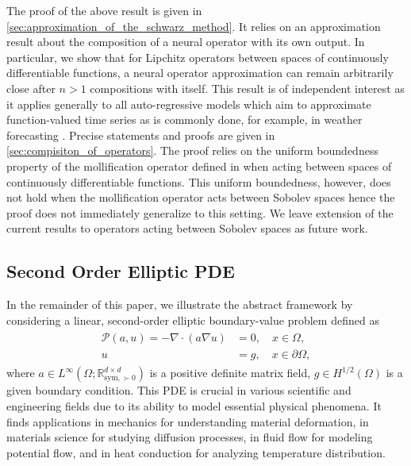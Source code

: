 \documentclass[preprint,11pt]{elsarticle}
\theoremstyle{plain}
\begin{document}
The proof of the above result is given in \ref{sec:approximation_of_the_schwarz_method}. It relies on an approximation result about the composition of a neural operator with its own output. In particular, we show that for Lipchitz operators between spaces of continuously differentiable functions, a neural operator approximation can remain arbitrarily close after $n > 1$ compositions with itself. This result is of independent interest as it applies generally to all auto-regressive models which aim to approximate function-valued time series as is commonly done, for example, in weather forecasting \cite{pathak2022fourcastnet, lam2023learning}. Precise statements and proofs are given in \ref{sec:compisiton_of_operators}. The proof relies on the uniform boundedness property of the mollification operator defined in \cite[Appendix A]{lanthaler2023nonlocality} when acting between spaces of continuously differentiable functions. This uniform boundedness, however, does not hold when the mollification operator acts between Sobolev spaces hence the proof does not immediately generalize to this setting. We leave extension of the current results to operators acting between Sobolev spaces as future work. 



\subsection{Second Order Elliptic PDE}
In the remainder of this paper, we illustrate the abstract framework by considering a linear, second-order elliptic boundary-value problem defined as
\begin{align}
\label{eq:second_order_elliptic_pde}
\begin{split}
    \mathcal{P}(a, u) = -\nabla \cdot (a \nabla u)  &= 0, \quad x \in \Omega, \\
    u &= g, \quad x \in \partial \Omega,
\end{split}
\end{align}
where \(a \in  L^{\infty} (\Omega; \mathbb{R}^{d \times d}_{\text{sym}, \succ 0})\) is a positive definite matrix field, $g \in H^{1/2}(\Omega)$ is a given boundary condition. This PDE is crucial in various scientific and engineering fields due to its ability to model essential physical phenomena. It finds applications in mechanics for understanding material deformation, in materials science for studying diffusion processes, in fluid flow for modeling potential flow, and in heat conduction for analyzing temperature distribution. 
\end{document}
